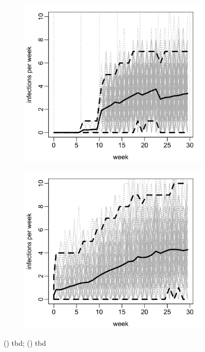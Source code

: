 \documentclass{uwstat572}
\begin{document}
\begin{figure}[H]
	\centering
	\begin{subfigure}[b]{0.49\textwidth}
		\includegraphics[width=\textwidth]{figures/figure_4a.png}
		\caption{}
		\label{fig:cond_infections}
	\end{subfigure}
	\hfill
	\begin{subfigure}[b]{0.49\textwidth}
		\includegraphics[width=\textwidth]{figures/figure_4b.png}
		\caption{}
		\label{fig:sim_infection}
	\end{subfigure}
	\caption{() tbd; () tbd }
	\label{fig:sim_epidemic}
\end{figure} 
\end{document}
